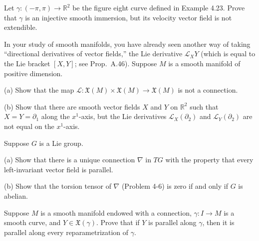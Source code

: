 \begin{exercise}\label{prob:figure-eight-immersion}
Let $\gamma: (-\pi, \pi) \to \mathbb{R}^2$ be the figure eight curve defined in Example 4.23. Prove that $\gamma$ is an injective smooth immersion, but its velocity vector field is not extendible.
\end{exercise}

\begin{exercise}\label{prob:lie-derivative-not-connection}
In your study of smooth manifolds, you have already seen another way of taking ``directional derivatives of vector fields,'' the Lie derivative $\mathcal{L}_X Y$ (which is equal to the Lie bracket $[X,Y]$; see Prop.~A.46). Suppose $M$ is a smooth manifold of positive dimension.

(a) Show that the map $\mathcal{L}: \mathfrak{X}(M) \times \mathfrak{X}(M) \to \mathfrak{X}(M)$ is not a connection.

(b) Show that there are smooth vector fields $X$ and $Y$ on $\mathbb{R}^2$ such that $X = Y = \partial_1$ along the $x^1$-axis, but the Lie derivatives $\mathcal{L}_X(\partial_2)$ and $\mathcal{L}_Y(\partial_2)$ are not equal on the $x^1$-axis.
\end{exercise}

\begin{exercise}
\label{prob:lie-group-connection}
Suppose $G$ is a Lie group.

(a) Show that there is a unique connection $\nabla$ in $TG$ with the property that every left-invariant vector field is parallel.

(b) Show that the torsion tensor of $\nabla$ (Problem 4-6) is zero if and only if $G$ is abelian.
\end{exercise}

\begin{exercise}
\label{prob:parallel-reparametrization}

Suppose $M$ is a smooth manifold endowed with a connection, $\gamma: I \to M$ is a smooth curve, and $Y \in \mathfrak{X}(\gamma)$. Prove that if $Y$ is parallel along $\gamma$, then it is parallel along every reparametrization of $\gamma$.
\end{exercise}

